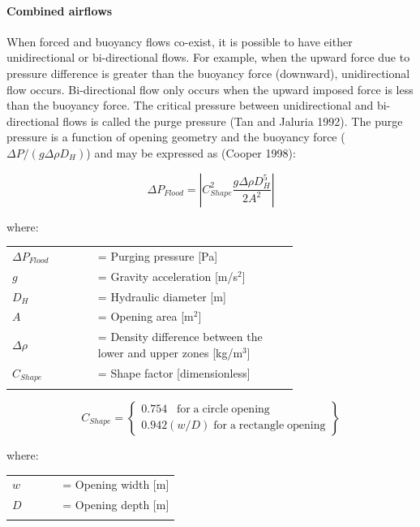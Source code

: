 \paragraph{Combined airflows}\label{combined-airflows}

When forced and buoyancy flows co-exist, it is possible to have either unidirectional or bi-directional flows. For example, when the upward force due to pressure difference is greater than the buoyancy force (downward), unidirectional flow occurs. Bi-directional flow only occurs when the upward imposed force is less than the buoyancy force. The critical pressure between unidirectional and bi-directional flows is called the purge pressure (Tan and Jaluria 1992). The purge pressure is a function of opening geometry and the buoyancy force (\(\Delta P/(g\Delta\rho D_H)\)) and may be expressed as (Cooper 1998):

\begin{equation}
\Delta {P_{Flood}} = \left| {C_{Shape}^2\frac{{g\Delta \rho D_H^5}}{{2{A^2}}}} \right|
\end{equation}

where:

\begin{tabular}{lp{0.7\linewidth}}
\\
$\Delta P_{Flood}$ &= Purging pressure [Pa]\\
$g$ &= Gravity acceleration [m/s\(^{2}\)]\\
$D_H$ &= Hydraulic diameter [m]\\
$A$ &= Opening area [m\(^{2}\)]\\
$\Delta \rho$ &= Density difference between the lower and upper zones [kg/m\(^{3}\)]\\
$C_{Shape}$ &= Shape factor [dimensionless]\\
\\
\end{tabular}

\begin{equation}
C_{Shape} = \left\{ \begin{array}{l}0.754\;\;\;{\mathrm{for}}\;{\mathrm{a}}\;{\mathrm{circle}}\;{\mathrm{opening}}\\0.942(w/D)\;{\mathrm{for}}\;{\mathrm{a}}\;{\mathrm{rectangle}}\;{\mathrm{opening}}\end{array} \right\}
\end{equation}

where:

\begin{tabular}{lp{0.7\linewidth}}
\\
$w$ &= Opening width [m]\\
$D$ &= Opening depth [m]\\
\\
\end{tabular}


